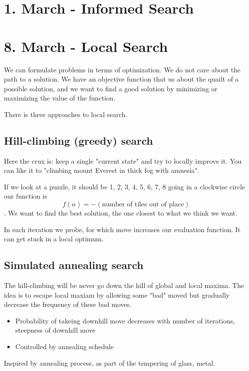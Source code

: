 \documentclass{article}
\begin{document}
\newpage

\section{1. March - Informed Search}%
\label{sec:1_march_informed_search}

\section{8. March - Local Search}
We can formulate problems in terms of optimization. We do not care about the
path to a solution. We have an objective function that us about the quailt of a
possible solution, and we want to find a good solution by minimizing or
maximizing the value of the function.

There is three approaches to local search.

\subsection{Hill-climbing (greedy) search}
Here the crux is: keep a single "current state" and try to locally improve it.
You can like it to "climbing mount Everest in thick fog with amnesia".

If we look at a puzzle, it should be 1, 2, 3, 4, 5, 6, 7, 8 going in a clockwise
circle our function is $$f(n) = -(\text{number of tiles out of place})$$.
We want to find the best solution, the one closest to what we think we want.

In each iteration we probe, for which move increases our evaluation function.
It can get stuck in a local optimum.

\subsection{Simulated annealing search}
The hill-climbing will be never go down the hill of global and local maxima. 
The idea is to escape local maxiam by allowing some "bad" moved but gradually
decrease the frequency of these bad moves.
\begin{itemize}
  \item Probability of takeing downhill move decreases with number of
    iterations, steepness of downhill move
  \item Controlled by annealing schedule 
\end{itemize}
Inspired by annealing process, as part of the tempering of glass, metal.
\end{document}
